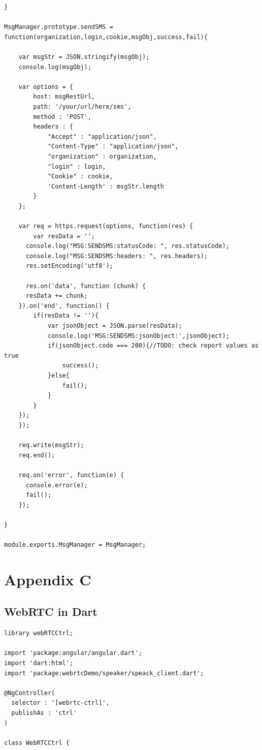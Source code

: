 \begin{appendices}
\begin{lstlisting}[caption={msg.js on Application Server},label={code:msg}]
}

MsgManager.prototype.sendSMS = function(organization,login,cookie,msgObj,success,fail){

	var msgStr = JSON.stringify(msgObj);
	console.log(msgObj);

	var options = {
		host: msgRestUrl,
		path: '/your/url/here/sms',
		method : 'POST',
		headers : {
			"Accept" : "application/json",
			"Content-Type" : "application/json",
			"organization" : organization,
			"login" : login,
			"Cookie" : cookie,
			'Content-Length' : msgStr.length
		}
	};

	var req = https.request(options, function(res) {
		var resData = '';
	  console.log("MSG:SENDSMS:statusCode: ", res.statusCode);
	  console.log("MSG:SENDSMS:headers: ", res.headers);
	  res.setEncoding('utf8');

	  res.on('data', function (chunk) {
      resData += chunk;
    }).on('end', function() {
    	if(resData != ''){
    		var jsonObject = JSON.parse(resData);
    		console.log('MSG:SENDSMS:jsonObject:',jsonObject);
    		if(jsonObject.code === 200){//TODO: check report values as true
    			success();
    		}else{
    			fail();
    		}
    	}
    });
	});

	req.write(msgStr);
	req.end();

	req.on('error', function(e) {
	  console.error(e);
	  fail();
	});

}

module.exports.MsgManager = MsgManager;
\end{lstlisting}

\chapter{Appendix C}

\section{WebRTC in Dart} 
\label{research:dart_webrtcctrl}

\begin{lstlisting}[caption={WebRTCCtrl in Dart application client},label={code:dart_webrtcctrl}]
library webRTCCtrl;

import 'package:angular/angular.dart';
import 'dart:html';
import 'package:webrtcDemo/speaker/speack_client.dart';

@NgController(
  selector : '[webrtc-ctrl]',
  publishAs : 'ctrl'
)

class WebRTCCtrl {


\end{lstlisting}
\end{appendices}
